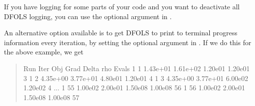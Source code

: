 \documentclass[letterpaper,10pt,english]{sphinxmanual}
\begin{document}
If you have logging for some parts of your code and you want to deactivate all DFO\sphinxhyphen{}LS logging, you can use the optional argument  in .

An alternative option available is to get DFO\sphinxhyphen{}LS to print to terminal progress information every iteration, by setting the optional argument  in . If we do this for the above example, we get
\begin{quote}

\begin{sphinxVerbatim}[commandchars=\\\{\}]
 Run  Iter     Obj       Grad     Delta      rho     Evals
  1     1    1.43e+01  1.61e+02  1.20e\PYGZhy{}01  1.20e\PYGZhy{}01    3
  1     2    4.35e+00  3.77e+01  4.80e\PYGZhy{}01  1.20e\PYGZhy{}01    4
  1     3    4.35e+00  3.77e+01  6.00e\PYGZhy{}02  1.20e\PYGZhy{}02    4
...
  1    55    1.00e\PYGZhy{}02  2.00e\PYGZhy{}01  1.50e\PYGZhy{}08  1.00e\PYGZhy{}08   56
  1    56    1.00e\PYGZhy{}02  2.00e\PYGZhy{}01  1.50e\PYGZhy{}08  1.00e\PYGZhy{}08   57
\end{sphinxVerbatim}
\end{quote}
\end{document}
